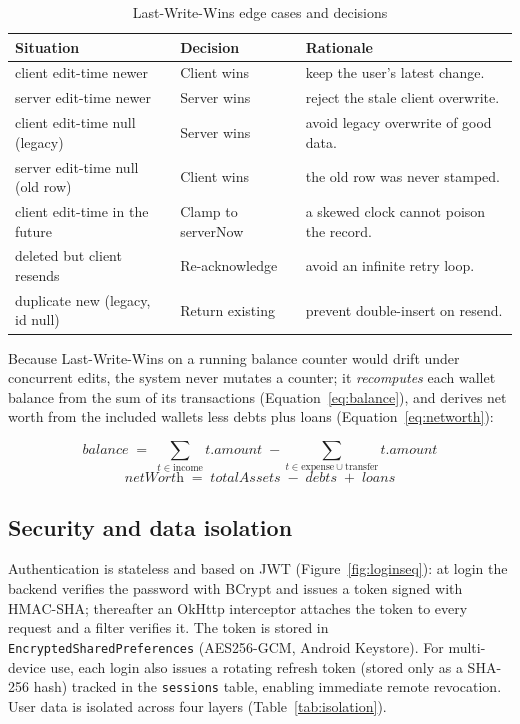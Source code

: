 \documentclass[13pt,a4paper]{extarticle}
\begin{document}
\begin{table}[H]
\centering
\caption{Last-Write-Wins edge cases and decisions}
\label{tab:lww}
\renewcommand{\arraystretch}{1.2}
\begin{tabularx}{\textwidth}{@{}X l X@{}}
\toprule
\textbf{Situation} & \textbf{Decision} & \textbf{Rationale} \\
\midrule
client edit-time newer            & Client wins  & keep the user's latest change. \\
server edit-time newer            & Server wins  & reject the stale client overwrite. \\
client edit-time null (legacy)    & Server wins  & avoid legacy overwrite of good data. \\
server edit-time null (old row)   & Client wins  & the old row was never stamped. \\
client edit-time in the future    & Clamp to serverNow & a skewed clock cannot poison the record. \\
deleted but client resends        & Re-acknowledge & avoid an infinite retry loop. \\
duplicate new (legacy, id null)   & Return existing & prevent double-insert on resend. \\
\bottomrule
\end{tabularx}
\end{table}

Because Last-Write-Wins on a running balance counter would drift under concurrent edits, the system
never mutates a counter; it \emph{recomputes} each wallet balance from the sum of its transactions
(Equation~\ref{eq:balance}), and derives net worth from the included wallets less debts plus loans
(Equation~\ref{eq:networth}):

\begin{equation}
\label{eq:balance}
\textit{balance} \;=\; \sum_{t \in \text{income}} t.\textit{amount} \;-\!\! \sum_{t \in \text{expense} \cup \text{transfer}} t.\textit{amount}
\end{equation}
\begin{equation}
\label{eq:networth}
\textit{netWorth} \;=\; \textit{totalAssets} \;-\; \textit{debts} \;+\; \textit{loans}
\end{equation}

\subsection{Security and data isolation}
Authentication is stateless and based on JWT (Figure~\ref{fig:loginseq}): at login the backend
verifies the password with BCrypt and issues a token signed with HMAC-SHA; thereafter an OkHttp
interceptor attaches the token to every request and a filter verifies it. The token is stored in
\texttt{EncryptedSharedPreferences} (AES256-GCM, Android Keystore). For multi-device use, each login
also issues a rotating refresh token (stored only as a SHA-256 hash) tracked in the
\texttt{sessions} table, enabling immediate remote revocation. User data is isolated across four
layers (Table~\ref{tab:isolation}).
\end{document}
